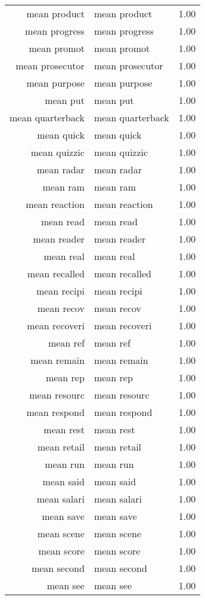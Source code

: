 \begin{table}[ht]
\begin{tabular}{rlr}
  mean product & mean product & 1.00 \\ 
  mean progress & mean progress & 1.00 \\ 
  mean promot & mean promot & 1.00 \\ 
  mean prosecutor & mean prosecutor & 1.00 \\ 
  mean purpose & mean purpose & 1.00 \\ 
  mean put & mean put & 1.00 \\ 
  mean quarterback & mean quarterback & 1.00 \\ 
  mean quick & mean quick & 1.00 \\ 
  mean quizzic & mean quizzic & 1.00 \\ 
  mean radar & mean radar & 1.00 \\ 
  mean ram & mean ram & 1.00 \\ 
  mean reaction & mean reaction & 1.00 \\ 
  mean read & mean read & 1.00 \\ 
  mean reader & mean reader & 1.00 \\ 
  mean real & mean real & 1.00 \\ 
  mean recalled & mean recalled & 1.00 \\ 
  mean recipi & mean recipi & 1.00 \\ 
  mean recov & mean recov & 1.00 \\ 
  mean recoveri & mean recoveri & 1.00 \\ 
  mean ref & mean ref & 1.00 \\ 
  mean remain & mean remain & 1.00 \\ 
  mean rep & mean rep & 1.00 \\ 
  mean resourc & mean resourc & 1.00 \\ 
  mean respond & mean respond & 1.00 \\ 
  mean rest & mean rest & 1.00 \\ 
  mean retail & mean retail & 1.00 \\ 
  mean run & mean run & 1.00 \\ 
  mean said & mean said & 1.00 \\ 
  mean salari & mean salari & 1.00 \\ 
  mean save & mean save & 1.00 \\ 
  mean scene & mean scene & 1.00 \\ 
  mean score & mean score & 1.00 \\ 
  mean second & mean second & 1.00 \\ 
  mean see & mean see & 1.00 \\ 

\end{tabular}
\end{table}
